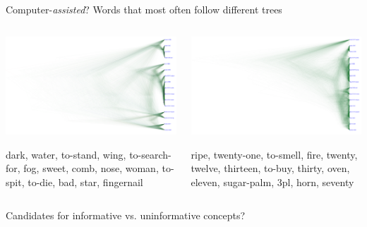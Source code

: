 \documentclass[
10pt,
]{beamer}
\begin{document}
\begin{frame}{Computer-\emph{assisted}?}
  Words that most often follow different trees
  \medskip
  \begin{columns}
    \begin{column}{0.5\textwidth}
      \includegraphics[clip, trim=10cm 1cm 0cm 1cm, width=\textwidth]{trees3.pdf}

      \footnotesize dark, water, to-stand, wing, to-search-for, fog, sweet, comb, nose, woman, to-spit, to-die, bad, star, fingernail
    \end{column}
    \begin{column}{0.5\textwidth}
      \includegraphics[clip, trim=10cm 1cm 0cm 1cm, width=\textwidth]{trees4.pdf}

      \footnotesize ripe, twenty-one, to-smell, fire, twenty, twelve, thirteen, to-buy, thirty, oven, eleven, sugar-palm, 3pl, horn, seventy
    \end{column}
  \end{columns}

  \medskip
  Candidates for informative vs. uninformative concepts?
\end{frame}
\end{document}
